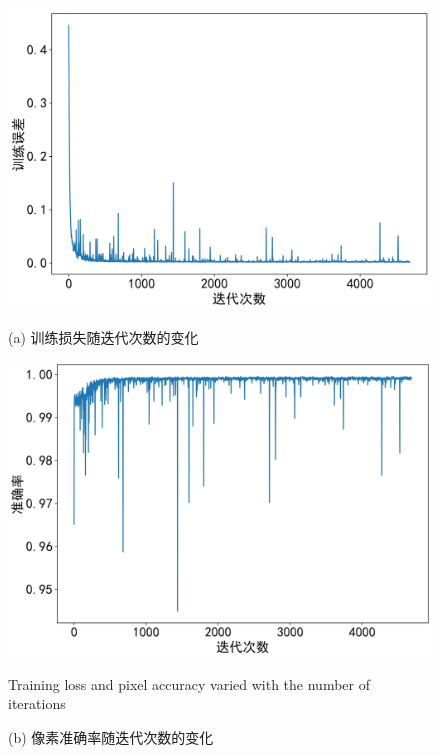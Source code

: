 	\begin{figure}[!htp]    
	\begin{minipage}[t]{0.5\linewidth}%
		\centering    
		\includegraphics[width=1\linewidth]{figure/chap3/loss.jpg}    
		\caption*{(a) 训练损失随迭代次数的变化}%
		\label{fig:angle}    
	\end{minipage}    
	\begin{minipage}[t]{0.5\linewidth}%
		\centering    
		\includegraphics[width=1\linewidth]{figure/chap3/acc.jpg}    
		\caption*{(b) 像素准确率随迭代次数的变化}
		\label{fig:freq}
	\end{minipage}
	{Training loss and pixel accuracy varied with the number of iterations}%
	\label{fig:train_progress}
	\end{figure}
